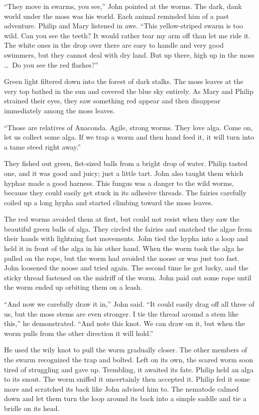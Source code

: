 \documentclass[10pt]{memoir}
\begin{document}
``They move in swarms, you see,'' John pointed at the worms. The dark, dank
world under the moss was his world. Each animal reminded him of a past
adventure. Philip and Mary listened in awe. ``This yellow-striped swarm is too
wild. Can you see the teeth? It would rather tear my arm off than let me ride
it. The white ones in the drop over there are easy to handle and very good
swimmers, but they cannot deal with dry land. But up there, high up in the
moss \dots\ Do you see the red flashes?''

Green light filtered down into the forest of dark stalks. The moss leaves at
the very top bathed in the sun and covered the blue sky entirely. As Mary and
Philip strained their eyes, they saw something red appear and then disappear
immediately among the moss leaves.

``Those are relatives of Anaconda. Agile, strong worms. They love alga. Come
on, let us collect some alga. If we trap a worm and then hand feed it, it will
turn into a tame steed right away.''

They fished out green, fist-sized balls from a bright drop of water. Philip
tasted one, and it was good and juicy; just a little tart. John also taught
them which hyphae made a good harness. This fungus was a danger to the wild
worms, because they could easily get stuck in its adhesive threads. The fairies
carefully coiled up a long hypha and started climbing toward the moss leaves.

The red worms avoided them at first, but could not resist when they saw the
beautiful green balls of alga. They circled the fairies and snatched the algae
from their hands with lightning fast movements. John tied the hypha into a loop
and held it in front of the alga in his other hand. When the worm took the
alga he pulled on the rope, but the worm had avoided the noose or was just too
fast. John loosened the noose and tried again. The second time he got lucky,
and the sticky thread fastened on the midriff of the worm. John paid out some
rope until the worm ended up orbiting them on a leash.

``And now we carefully draw it in,'' John said. ``It could easily drag off all
three of us, but the moss stems are even stronger. I tie the thread around a
stem like this,'' he demonstrated. ``And note this knot. We can draw on it, but
when the worm pulls from the other direction it will hold.''

He used the wily knot to pull the worm gradually closer. The other members of
the swarm recognized the trap and bolted. Left on its own, the scared worm
soon tired of struggling and gave up. Trembling, it awaited its fate. Philip
held an alga to its snout. The worm sniffed it uncertainly then accepted it.
Philip fed it some more and scratched its back like John advised him to. The
nematode calmed down and let them turn the loop around its back into a simple
saddle and tie a bridle on its head.
\end{document}
